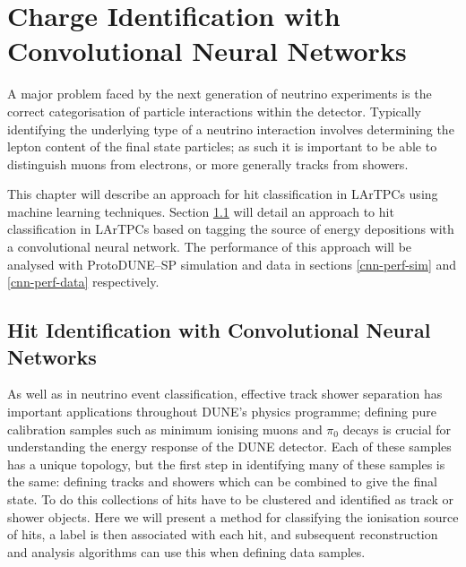 \chapter{\label{ch:chargeid}Charge Identification with Convolutional Neural 
Networks} 

\minitoc

A major problem faced by the next generation of neutrino experiments
is the correct categorisation of particle interactions within the detector.
Typically identifying the underlying type of a neutrino interaction involves
determining the lepton content of the final state particles; as such it is
important to be able to distinguish muons from electrons, or more generally
tracks from showers.

This chapter will describe an approach for hit classification in LArTPCs using
machine learning techniques. Section \ref{hit-id} will detail an approach to 
hit classification in LArTPCs based on tagging the source of energy 
depositions with a convolutional neural network.  The performance of this 
approach will be analysed with ProtoDUNE--SP simulation and data in sections 
\ref{cnn-perf-sim} and \ref{cnn-perf-data} respectively.


\section{Hit Identification with Convolutional Neural Networks}
\label{hit-id}

As well as in neutrino event classification, effective track shower separation
has important applications throughout DUNE's physics programme; defining pure
calibration samples such as minimum ionising muons and \(\pi_0\) decays is
crucial for understanding the energy response of the DUNE detector. Each of
these samples has a unique topology, but the first step in identifying many of
these samples is the same: defining tracks and showers which can be combined to
give the final state. To do this collections of hits have to be clustered and
identified as track or shower objects. Here we will present a method for
classifying the ionisation source of hits, a label is then associated with each
hit, and subsequent reconstruction and analysis algorithms can use this when
defining data samples.

